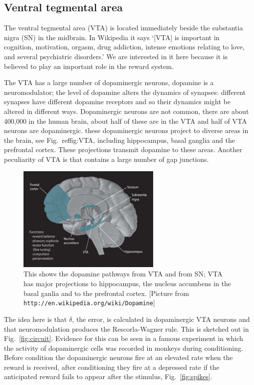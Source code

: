 \documentclass[11pt,a4paper]{scrartcl}
\begin{document}
\subsection*{Ventral tegmental area}

The ventral tegmental area (VTA) is located immediately beside the
substantia nigra (SN) in the midbrain. In Wikipedia it says \lq{}[VTA] is
important in cognition, motivation, orgasm, drug addiction, intense
emotions relating to love, and several psychiatric disorders.\rq{} We
are interested in it here because it is believed to play an important
role in the reward system. 

The VTA has a large number of dopaminergic neurons, dopamine is a
neuromodulator; the level of dopamine alters the dynamics of synapses:
different synapses have different dopamine receptors and so their
dynamics might be altered in different ways. Dopaminergic neurons are
not common, there are about 400,000 in the human brain, about half of
these are in the VTA and half of VTA neurons are dopaminergic. these
dopaminergic neurons project to diverse areas in the brain, see
Fig.~ref{fig:VTA}, including hippocampus, basal ganglia and the
prefrontal cortex. These projections transmit dopamine to these
areas. Another peculiarity of VTA is that contains a large number of
gap junctions.

\begin{figure}
\begin{center}
\includegraphics[width=7cm]{Dopamine_Pathways.png}
\end{center}
\caption{This shows the dopamine pathways from VTA and from SN; VTA
  has major projections to hippocampus, the nucleus accumbens in the
  basal ganlia and to the prefrontal cortex. [Picture from
    \texttt{http://en.wikipedia.org/wiki/Dopamine}]\label{fig:VTA}}
\end{figure}

The idea here is that $\delta$, the error, is calculated in
dopaminergic VTA neurons and that neuromodulation produces the
Rescorla-Wagner rule. This is sketched out in
Fig.~\ref{fig:circuit}. Evidence for this can be seen in a famous
experiment \cite{SchultzDayanMontague1997a} in which the activity of
dopaminergic cells was recorded in monkeys during conditioning. Before
condition the dopaminergic neurons fire at an elevated rate when the
reward is received, after conditioning they fire at a depressed rate
if the anticipated reward fails to appear after the stimulus, Fig.~\ref{fig:spikes}.
\end{document}
